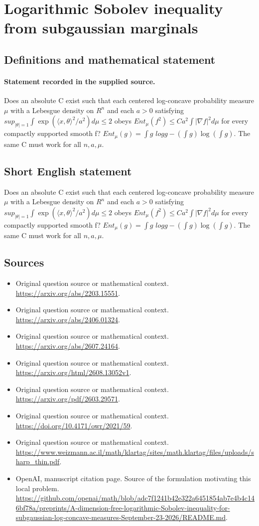 \documentclass[11pt]{article}
\begin{document}
\section*{Logarithmic Sobolev inequality from subgaussian marginals}\label{30007120}
\subsection{Definitions and mathematical statement}
\paragraph{Statement recorded in the supplied source.}
Does an absolute C exist such that each centered log-concave probability measure $\mu $ with a Lebesgue density on $R^{n}$ and each $a>0$ satisfying $sup_{|\theta |=1}\int \exp (\langle x,\theta \rangle ^{2}/a^{2})d\mu \leq 2$ obeys $Ent_\mu (f^{2})\leq Ca^{2}\int |\nabla f|^{2}d\mu $ for every compactly supported smooth f? $Ent_\mu (g)=\int g$ $logg-(\int g)\log (\int g)$. The same C must work for all $n,a,\mu $.
\subsection{Short English statement}
Does an absolute C exist such that each centered log-concave probability measure $\mu $ with a Lebesgue density on $R^{n}$ and each $a>0$ satisfying $sup_{|\theta |=1}\int \exp (\langle x,\theta \rangle ^{2}/a^{2})d\mu \leq 2$ obeys $Ent_\mu (f^{2})\leq Ca^{2}\int |\nabla f|^{2}d\mu $ for every compactly supported smooth f? $Ent_\mu (g)=\int g$ $logg-(\int g)\log (\int g)$. The same C must work for all $n,a,\mu $.
\subsection{Sources}
\begin{itemize}
\item[S1] Original question source or mathematical context.
\url{https://arxiv.org/abs/2203.15551}.
\item[S2] Original question source or mathematical context.
\url{https://arxiv.org/abs/2406.01324}.
\item[S3] Original question source or mathematical context.
\url{https://arxiv.org/abs/2607.24164}.
\item[S4] Original question source or mathematical context.
\url{https://arxiv.org/html/2608.13052v1}.
\item[S5] Original question source or mathematical context.
\url{https://arxiv.org/pdf/2603.29571}.
\item[S6] Original question source or mathematical context.
\url{https://doi.org/10.4171/owr/2021/59}.
\item[S7] Original question source or mathematical context.
\url{https://www.weizmann.ac.il/math/klartag/sites/math.klartag/files/uploads/sharp_thin.pdf}.
\item[S8] OpenAI, manuscript citation page. Source of the formulation motivating this local problem.
\url{https://github.com/openai/math/blob/adc7f1241b42e322a6451854ab7e4b4c146bf78a/preprints/A-dimension-free-logarithmic-Sobolev-inequality-for-subgaussian-log-concave-measures-September-23-2026/README.md}.
\end{itemize}
\end{document}
